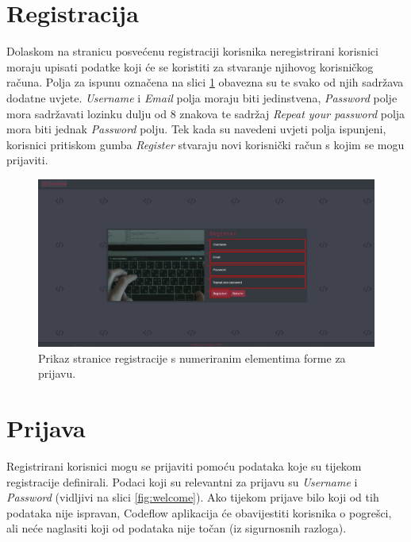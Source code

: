 \documentclass[times, utf8, zavrsni, numeric]{fer}
\begin{document}
		\section{Registracija}
		Dolaskom na stranicu posvećenu registraciji korisnika neregistrirani korisnici moraju upisati podatke koji će se koristiti za stvaranje njihovog korisničkog računa. Polja za ispunu označena na slici \ref{fig:register} obavezna su te svako od njih sadržava dodatne uvjete. \textit{Username} i \textit{Email} polja moraju biti jedinstvena, \textit{Password} polje mora sadržavati lozinku dulju od 8 znakova te sadržaj \textit{Repeat your password} polja mora biti jednak \textit{Password} polju. Tek kada su navedeni uvjeti polja ispunjeni, korisnici pritiskom gumba \textit{Register} stvaraju novi korisnički račun s kojim se mogu prijaviti.
		\begin{figure}[H]
			\centering
			\includegraphics[width=\linewidth]{pictures/koristenje/Registracija.png}
			\caption{Prikaz stranice registracije s numeriranim elementima forme za prijavu.}
			\label{fig:register}
		\end{figure}
	
		\section{Prijava}
		Registrirani korisnici mogu se prijaviti pomoću podataka koje su tijekom registracije definirali. Podaci koji su relevantni za prijavu su \textit{Username} i \textit{Password} (vidljivi na slici \ref{fig:welcome}). Ako tijekom prijave bilo koji od tih podataka nije ispravan, Codeflow aplikacija će obavijestiti korisnika o pogrešci, ali neće naglasiti koji od podataka nije točan (iz sigurnosnih razloga).
	
\end{document}
